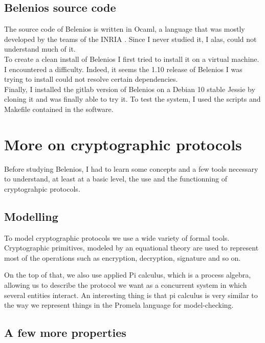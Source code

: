 \documentclass[12pt, a4paper]{report}
\begin{document}
\subsection{Belenios source code}

The source code of Belenios is written in Ocaml, a language that was mostly developed by the teams of the INRIA . Since I never studied it, I alas, could not understand much of it.\\ 

To create a clean install of Belenios I first tried to install it on a virtual machine. I encountered a difficulty. Indeed, it seems the 1.10 release of Belenios I was trying to install could not resolve certain dependencies.\\

Finally, I installed the gitlab version of Belenios on a Debian 10 stable Jessie by cloning it and was finally able to try it. To test the system, I used the scripts and Makefile contained in the software.



\section{More on cryptographic protocols}

Before studying Belenios, I had to learn some concepts and a few tools necessary to understand, at least at a basic level, the use and the functionning of cryptograhpic protocols. 

\subsection{Modelling}

To model cryptographic protocols we use a wide variety of formal tools.
Cryptographic primitives, modeled by an equational theory are used to represent most of the operations such as encryption, decryption, signature and so on.

On the top of that, we also use applied Pi calculus, which is a process algebra, allowing us to describe the protocol we want as a concurrent system in which several entities interact. An interesting thing is that pi calculus is very similar to the way we represent things in the Promela language for model-checking. 

\subsection{A few more properties}
\end{document}
